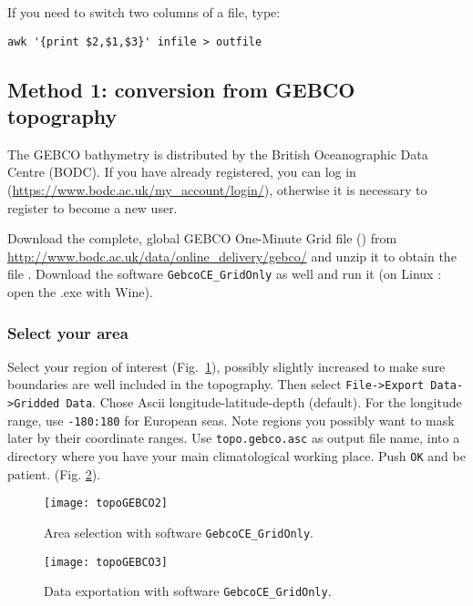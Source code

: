 If you need to switch two columns of a file, type:
\begin{verbatim}
awk '{print $2,$1,$3}' infile > outfile
\end{verbatim}
\etips



\subsection{Method 1: conversion from GEBCO topography\label{sec:topogebco}}

The GEBCO bathymetry is distributed by the British Oceanographic Data Centre (BODC). If you have already registered, you can log in (\url{https://www.bodc.ac.uk/my\_account/login/}), otherwise it is necessary to register to become a new user. 

Download the complete, global GEBCO One-Minute Grid file () from \url{http://www.bodc.ac.uk/data/online\_delivery/gebco/} and unzip it to obtain the file . Download the software \texttt{GebcoCE\_GridOnly} as well and run it (on Linux : open the .exe with Wine). 

\subsubsection{Select your area}

Select your region of interest (Fig.~\ref{fig:gebco1}), possibly slightly increased to make sure boundaries are well included in the topography. Then select {\tt File->Export Data->Gridded Data}. Chose Ascii longitude-latitude-depth (default). For the longitude range, use {\tt -180:180} for European seas. Note regions you possibly want to mask later by their coordinate ranges.  Use {\tt topo.gebco.asc} as output file name, into a directory where
you have your main climatological working place. Push {\tt OK} and be patient. (Fig. \ref{fig:gebco2}). 

\begin{figure}[htpb]
\centering
\texttt{[image: topoGEBCO2]}
\caption{Area selection with software \texttt{GebcoCE\_GridOnly}.\label{fig:gebco1}}
\end{figure}


\begin{figure}[htpb]
\centering
\texttt{[image: topoGEBCO3]}
\caption{Data exportation with software \texttt{GebcoCE\_GridOnly}.\label{fig:gebco2}}
\end{figure}



